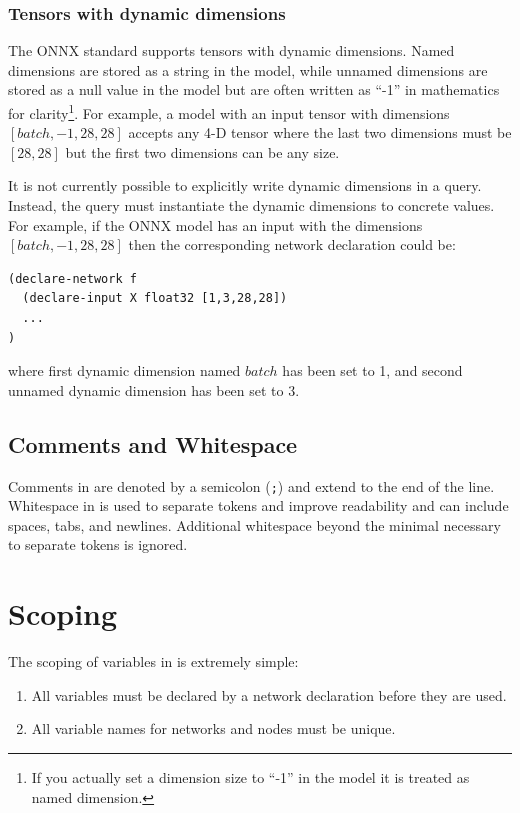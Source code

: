 \subsubsection{Tensors with dynamic dimensions}

The ONNX standard supports tensors with dynamic dimensions. 
Named dimensions are stored as a string in the model, while unnamed dimensions are stored as a null value in the model but are often written as ``-1'' in mathematics for clarity\footnote{If you actually set a dimension size to ``-1'' in the model it is treated as named dimension.}. 
For example, a model with an input tensor with dimensions $[batch, -1, 28, 28]$ accepts any 4-D tensor where the last two dimensions must be $[28, 28]$ but the first two dimensions can be any size.

It is not currently possible to explicitly write dynamic dimensions in a \vnnlib{} query. 
Instead, the query must instantiate the dynamic dimensions to concrete values. 
For example, if the ONNX model has an input with the dimensions $[batch, -1, 28, 28]$ then the corresponding network declaration could be:
\begin{lstlisting}[style=lbnf]
(declare-network f
  (declare-input X float32 [1,3,28,28])
  ...
)
\end{lstlisting}
where first dynamic dimension named $batch$ has been set to 1, and second unnamed dynamic dimension has been set to 3.

\subsection{Comments and Whitespace}
\label{sec:comments}

Comments in \vnnlib{} are denoted by a semicolon (\texttt{;}) and extend to the end of the line. Whitespace in \vnnlib{} is used to separate tokens and improve readability and can include spaces, tabs, and newlines. Additional whitespace beyond the minimal necessary to separate tokens is ignored.

\section{Scoping}
\label{sec:scoping}

The scoping of variables in \vnnlib{} is extremely simple:
\begin{enumerate}
    \item All variables must be declared by a network declaration before they are used.
    \item All variable names for networks and nodes must be unique.
\end{enumerate}


